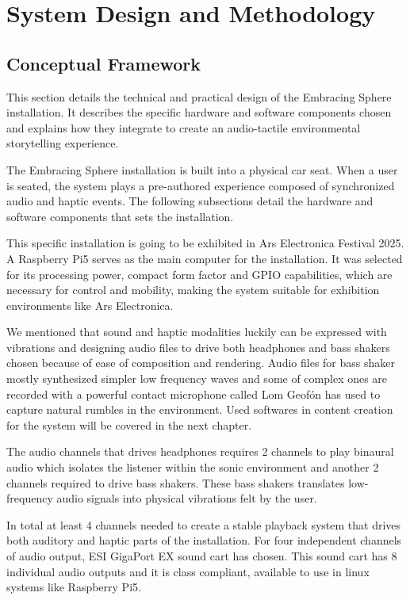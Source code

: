 \chapter{System Design and Methodology}
    \section{Conceptual Framework}
        This section details the technical and practical design of the Embracing Sphere installation. It describes the specific hardware and software components chosen and explains how they integrate to create an audio-tactile environmental storytelling experience.\par

        The Embracing Sphere installation is built into a physical car seat. When a user is seated, the system plays a pre-authored experience composed of synchronized audio and haptic events. The following subsections detail the hardware and software components that sets the installation.\par

        This specific installation is going to be exhibited in Ars Electronica Festival 2025. A Raspberry Pi5 serves as the main computer for the installation. It was selected for its processing power, compact form factor and GPIO capabilities, which are necessary for control and mobility, making the system suitable for exhibition environments like Ars Electronica.\par

        We mentioned that sound and haptic modalities luckily can be expressed with vibrations and  designing audio files to drive both headphones and bass shakers chosen because of ease of composition and rendering. Audio files for bass shaker mostly synthesized simpler low frequency waves and some of complex ones are recorded with a powerful contact microphone called Lom Geofón has used to capture natural rumbles in the environment. Used softwares in content creation for the system will be covered in the next chapter.\par

        The audio channels that drives headphones requires 2 channels to play binaural audio which isolates the listener within the sonic environment and another 2 channels required to drive bass shakers. These bass shakers translates low-frequency audio signals into physical vibrations felt by the user.\par

        In total at least 4 channels needed to create a stable playback system that drives both auditory and haptic parts of the installation. For four independent channels of audio output, ESI GigaPort EX sound cart has chosen. This sound cart has 8 individual audio outputs and it is class compliant, available to use in linux systems like Raspberry Pi5.\par

